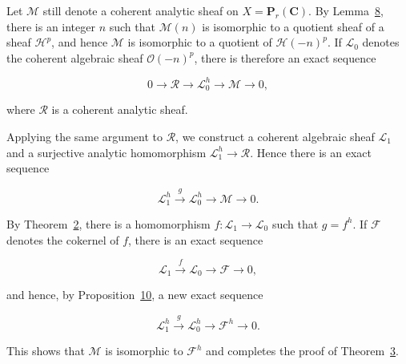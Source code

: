 
Let $\mathcal{M}$ still denote a coherent analytic sheaf on $X=\mathbf{P}_r(\mathbf{C})$. By Lemma~\hyperref[gaga:lemma:8]{8}, there is an integer $n$ such that $\mathcal{M}(n)$ is isomorphic to a quotient sheaf of a sheaf $\mathcal{H}^p$, and hence $\mathcal{M}$ is isomorphic to a quotient of $\mathcal{H}(-n)^p$. If $\mathcal{L}_0$ denotes the coherent algebraic sheaf $\mathcal{O}(-n)^p$, there is therefore an exact sequence

\begin{equation*}
0\longrightarrow\mathcal{R}\longrightarrow\mathcal{L}_0^h
\longrightarrow\mathcal{M}\longrightarrow0,
\end{equation*}

where $\mathcal{R}$ is a coherent analytic sheaf.

Applying the same argument to $\mathcal{R}$, we construct a coherent algebraic sheaf $\mathcal{L}_1$ and a surjective analytic homomorphism $\mathcal{L}_1^h\to\mathcal{R}$. Hence there is an exact sequence

\begin{equation*}
\mathcal{L}_1^h\xrightarrow{g}\mathcal{L}_0^h
\longrightarrow\mathcal{M}\longrightarrow0.
\end{equation*}

By Theorem~\hyperref[gaga:thm:2]{2}, there is a homomorphism $f:\mathcal{L}_1\to\mathcal{L}_0$ such that $g=f^h$. If $\mathcal{F}$ denotes the cokernel of $f$, there is an exact sequence

\begin{equation*}
\mathcal{L}_1\xrightarrow{f}\mathcal{L}_0
\longrightarrow\mathcal{F}\longrightarrow0,
\end{equation*}

and hence, by Proposition~\hyperref[gaga:prop:10]{10}, a new exact sequence

\begin{equation*}
\mathcal{L}_1^h\xrightarrow{g}\mathcal{L}_0^h
\longrightarrow\mathcal{F}^h\longrightarrow0.
\end{equation*}

This shows that $\mathcal{M}$ is isomorphic to $\mathcal{F}^h$ and completes the proof of Theorem~\hyperref[gaga:thm:3]{3}.
